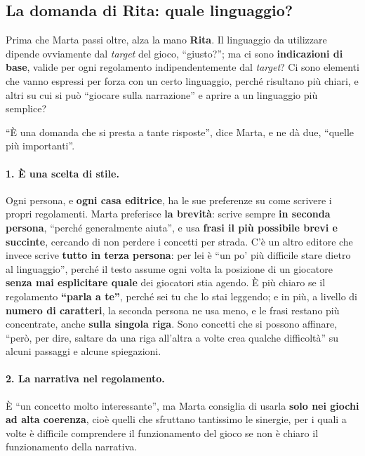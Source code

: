\subsection{La domanda di Rita: quale linguaggio?}

Prima che Marta passi oltre, alza la mano \textbf{Rita}. Il linguaggio da utilizzare
dipende ovviamente dal \emph{target} del gioco, ``giusto?''; ma ci sono \textbf{indicazioni
di base}, valide per ogni regolamento indipendentemente dal \emph{target}? Ci sono elementi
che vanno espressi per forza con un certo linguaggio, perché risultano più chiari, e altri su
cui si può ``giocare sulla narrazione'' e aprire a un linguaggio più semplice?

``È una domanda che si presta a tante risposte'', dice Marta, e ne dà due, ``quelle più
importanti''.

\paragraph{1. È una scelta di stile.} Ogni persona, e \textbf{ogni casa editrice}, ha le sue
preferenze su come scrivere i propri regolamenti. Marta preferisce \textbf{la brevità}:
scrive sempre \textbf{in seconda persona}, ``perché generalmente aiuta'', e usa
\textbf{frasi il più possibile brevi e succinte}, cercando di non perdere i concetti per
strada. C'è un altro editore che invece scrive \textbf{tutto in terza persona}: per lei è
``un po' più difficile stare dietro al linguaggio'', perché il testo assume ogni volta la
posizione di un giocatore \textbf{senza mai esplicitare quale} dei giocatori stia agendo. È
più chiaro se il regolamento \textbf{``parla a te''}, perché sei tu che lo stai leggendo; e
in più, a livello di \textbf{numero di caratteri}, la seconda persona ne usa meno, e le frasi
restano più concentrate, anche \textbf{sulla singola riga}. Sono concetti che si possono
affinare, ``però, per dire, saltare da una riga all'altra a volte crea qualche difficoltà''
su alcuni passaggi e alcune spiegazioni.

\paragraph{2. La narrativa nel regolamento.} È ``un concetto molto interessante'', ma Marta
consiglia di usarla \textbf{solo nei giochi ad alta coerenza}, cioè quelli che sfruttano
tantissimo le sinergie, per i quali a volte è difficile comprendere il funzionamento del gioco
se non è chiaro il funzionamento della narrativa.

